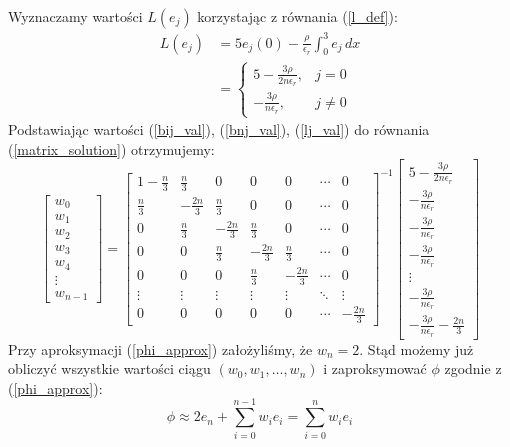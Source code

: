 \documentclass[a4paper,12pt]{article}
\begin{document}
    Wyznaczamy wartości \(L(e_j)\) korzystając z równania (\ref{l_def}):
    \begin{align}
        L(e_j) &= 5e_j(0) - \frac{\rho}{\epsilon_r} \int_{0}^{3} e_j\,dx \nonumber \\
        &=
        \begin{cases}
            5 - \frac{3\rho}{2n\epsilon_r},& j = 0 \\
            -\frac{3\rho}{n\epsilon_r},& j \neq 0
        \end{cases} \label{lj_val}
    \end{align}
    Podstawiając wartości (\ref{bij_val}), (\ref{bnj_val}), (\ref{lj_val}) do równania (\ref{matrix_solution}) otrzymujemy:
    \begin{equation}
        \begin{bmatrix}
            w_0 \\
            w_1 \\
            w_2 \\
            w_3 \\
            w_4 \\
            \vdots \\
            w_{n-1}
        \end{bmatrix}
        =
        \begin{bmatrix}
            1-\frac{n}{3} &  \frac{n}{3} &  0 &  0 &  0 & \cdots &  0 \\
            \frac{n}{3} & -\frac{2n}{3} &  \frac{n}{3} &  0 &  0 & \cdots &  0 \\
            0 &  \frac{n}{3} & -\frac{2n}{3} &  \frac{n}{3} &  0 & \cdots &  0 \\
            0 &  0 &  \frac{n}{3} & -\frac{2n}{3} &  \frac{n}{3} & \cdots &  0 \\
            0 &  0 &  0 &  \frac{n}{3} & -\frac{2n}{3} & \cdots &  0 \\
            \vdots & \vdots & \vdots & \vdots & \vdots & \ddots & \vdots \\
            0 &  0 &  0 &  0 &  0 & \cdots & -\frac{2n}{3}
        \end{bmatrix}
        ^{-1}
        \begin{bmatrix}
            5 - \frac{3\rho}{2n\epsilon_r} \\
            -\frac{3\rho}{n\epsilon_r} \\
            -\frac{3\rho}{n\epsilon_r} \\
            -\frac{3\rho}{n\epsilon_r} \\
            \vdots \\
            -\frac{3\rho}{n\epsilon_r} \\
            -\frac{3\rho}{n\epsilon_r}-\frac{2n}{3}
        \end{bmatrix} \label{matrix_nums}
    \end{equation}
    Przy aproksymacji (\ref{phi_approx}) założyliśmy, że \(w_n = 2\). Stąd możemy już obliczyć wszystkie wartości ciągu \((w_0, w_1, \ldots, w_n)\) i zaproksymować \(\phi\) zgodnie z (\ref{phi_approx}):
    \begin{equation}
        \phi \approx 2e_n + \sum_{i=0}^{n-1} w_i e_i = \sum_{i=0}^{n} w_i e_i
    \end{equation}
\end{document}
